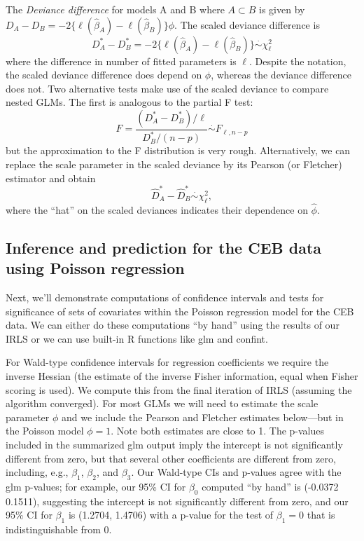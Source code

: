 \documentclass[
]{book}
\begin{document}
The \emph{Deviance difference} for models A and B where \(A\subset B\) is given by \(D_A - D_B = -2\{\ell(\hat\beta_A) - \ell(\hat\beta_B)\}\phi\). The scaled deviance difference is
\[D_A^* - D_B^* = -2\{\ell(\hat\beta_A) - \ell(\hat\beta_B)\}\stackrel{\cdot}{\sim}\chi^2_{\ell}\]
where the difference in number of fitted parameters is \(\ell\). Despite the notation, the scaled deviance difference does depend on \(\phi\), whereas the deviance difference does not. Two alternative tests make use of the scaled deviance to compare nested GLMs. The first is analogous to the partial F test:
\[F = \frac{(D_A^* - D_B^*)/\ell}{D_B^* / (n-p)}\stackrel{\cdot}{\sim} F_{\ell, n-p}\]
but the approximation to the F distribution is very rough. Alternatively, we can replace the scale parameter in the scaled deviance by its Pearson (or Fletcher) estimator and obtain
\[\hat D_A^* - \hat D_B^*\stackrel{\cdot}{\sim}\chi^2_{\ell},\]
where the ``hat'' on the scaled deviances indicates their dependence on \(\hat\phi\).

\hypertarget{inference-and-prediction-for-the-ceb-data-using-poisson-regression}{%
\subsection{Inference and prediction for the CEB data using Poisson regression}\label{inference-and-prediction-for-the-ceb-data-using-poisson-regression}}

Next, we'll demonstrate computations of confidence intervals and tests for significance of sets of covariates within the Poisson regression model for the CEB data. We can either do these computations ``by hand'' using the results of our IRLS or we can use built-in R functions like glm and confint.

For Wald-type confidence intervals for regression coefficients we require the inverse Hessian (the estimate of the inverse Fisher information, equal when Fisher scoring is used). We compute this from the final iteration of IRLS (assuming the algorithm converged). For most GLMs we will need to estimate the scale parameter \(\phi\) and we include the Pearson and Fletcher estimates below---but in the Poisson model \(\phi=1\). Note both estimates are close to 1. The p-values included in the summarized glm output imply the intercept is not significantly different from zero, but that several other coefficients are different from zero, including, e.g., \(\beta_1\), \(\beta_2\), and \(\beta_3\). Our Wald-type CIs and p-values agree with the glm p-values; for example, our 95\% CI for \(\beta_0\) computed ``by hand'' is (-0.0372 0.1511), suggesting the intercept is not significantly different from zero, and our 95\% CI for \(\beta_1\) is (1.2704, 1.4706) with a p-value for the test of \(\beta_1 = 0\) that is indistinguishable from 0.
\end{document}
